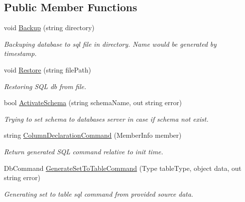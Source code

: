 \subsection*{Public Member Functions}
\begin{DoxyCompactItemize}
\item 
void \mbox{\hyperlink{class_uniform_data_operator_1_1_sql_1_1_my_sql_1_1_my_sql_data_operator_a0dbd58206733a17dd26143b58d0859d7}{Backup}} (string directory)
\begin{DoxyCompactList}\small\item\em Backuping database to sql file in directory. Name would be generated by timestamp. \end{DoxyCompactList}\item 
void \mbox{\hyperlink{class_uniform_data_operator_1_1_sql_1_1_my_sql_1_1_my_sql_data_operator_a22a9e92989ebdb3a52b8ebe409c59831}{Restore}} (string file\+Path)
\begin{DoxyCompactList}\small\item\em Restoring S\+QL db from file. \end{DoxyCompactList}\item 
bool \mbox{\hyperlink{class_uniform_data_operator_1_1_sql_1_1_my_sql_1_1_my_sql_data_operator_a2ed7d06bc016ae6d07cbcceffc21bbd3}{Activate\+Schema}} (string schema\+Name, out string error)
\begin{DoxyCompactList}\small\item\em Trying to set schema to databases server in case if schema not exist. \end{DoxyCompactList}\item 
string \mbox{\hyperlink{class_uniform_data_operator_1_1_sql_1_1_my_sql_1_1_my_sql_data_operator_a0bdc2943e5d10576fb564913cdd744e7}{Column\+Declaration\+Command}} (Member\+Info member)
\begin{DoxyCompactList}\small\item\em Return generated S\+QL command relative to init time. \end{DoxyCompactList}\item 
Db\+Command \mbox{\hyperlink{class_uniform_data_operator_1_1_sql_1_1_my_sql_1_1_my_sql_data_operator_ac3af074cabe5721a685f0650dc69a871}{Generate\+Set\+To\+Table\+Command}} (Type table\+Type, object data, out string error)
\begin{DoxyCompactList}\small\item\em Generating set to table sql command from provided source data. \end{DoxyCompactList}\item 

\end{DoxyCompactItemize}
